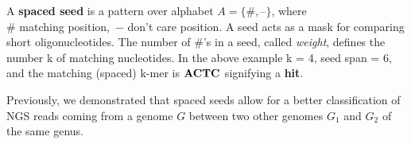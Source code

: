\documentclass[portrait,final,a0paper,fontscale=0.277]{baposter}
\begin{document}
\begin{poster}
{  A {\bf spaced seed} is a pattern over alphabet 
  $A=\{\textbf{\#}, \textbf{--}\}$, where\\
  $\#$ matching position,\, $-$ don't care position.
\vspace{-0.5em}  
\vspace{-0.8em}
A seed acts as a mask for comparing short oligonucleotides.
The number of $\textbf{\#}$'s in a seed, called {\em weight},
defines the number k of matching nucleotides. 
In the above example k = 4, seed span = 6,
and the matching (spaced) k-mer is ${\bf ACTC}$ signifying a {\bf hit}.

Previously, we demonstrated that spaced seeds allow for a better
   classification of NGS reads coming from a genome $G$ between two
  other genomes $G_1$ and $G_2$ of the same genus.\cite{sseed}
   \vspace{0.3em}
  }


\end{poster}
\end{document}
